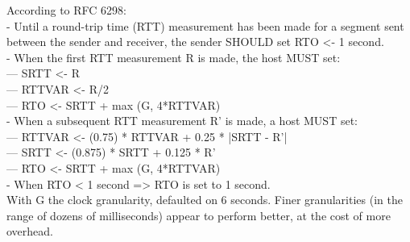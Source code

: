 According to RFC 6298:\\
- Until a round-trip time (RTT) measurement has been made for a segment sent between the sender and receiver, the sender SHOULD set RTO <- 1 second.\\
- When the first RTT measurement R is made, the host MUST set: \\
--- SRTT <- R\\
--- RTTVAR <- R/2\\
--- RTO <- SRTT + max (G, 4*RTTVAR)\\
- When a subsequent RTT measurement R' is made, a host MUST set:\\
--- RTTVAR <- (0.75) * RTTVAR + 0.25 * |SRTT - R'|\\
--- SRTT <- (0.875) * SRTT + 0.125 * R'\\
--- RTO <- SRTT + max (G, 4*RTTVAR)\\
- When RTO < 1 second => RTO is set to 1 second.\\
With G the clock granularity, defaulted on 6 seconds. Finer granularities (in the range of dozens of milliseconds) appear to perform better, at the cost of more overhead.

